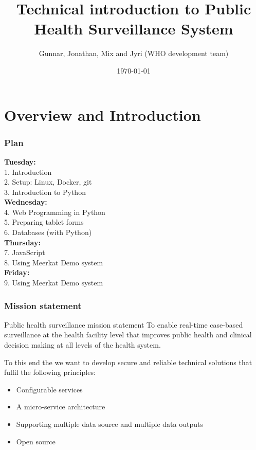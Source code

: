 \documentclass{beamer}
\title[Public Health Surveillance]{Technical introduction to Public Health Surveillance System}
\author{Gunnar, Jonathan, Mix and Jyri (WHO development team)}
\institute[WHO]{World Health Organisation}
\date{\today}
\begin{document}
\begin{frame}
\titlepage
\end{frame}

\begin{frame}
\tableofcontents
\end{frame}

\section{Overview and Introduction}
\begin{frame}
  \frametitle{Plan}

  \textbf{Tuesday:}\\
  	1. Introduction \\
	2. Setup: Linux, Docker, git \\
	3. Introduction to Python\\
  \textbf{ Wednesday:}\\
	4. Web Programming in Python \\
	5. Preparing tablet forms \\
	6. Databases (with Python) \\
  \textbf{Thursday:}\\
  	7. JavaScript\\
	8. Using Meerkat Demo system\\
  \textbf{ Friday:}\\
  	9. Using Meerkat Demo system\\
  
\end{frame}
\begin{frame}
  \frametitle{Mission statement}

  \begin{block}{Public health surveillance mission statement}
    To enable real-time case-based surveillance at the health facility level that improves public health and clinical decision making at all levels of the health system.
  \end{block}
  \vspace{10pt}
  To this end the we want to develop secure and reliable technical solutions that fulfil the following principles:

  
  \begin{itemize}
  \item Configurable services
  \item A micro-service architecture
  \item Supporting multiple data source and multiple data outputs
    \item Open source
  \end{itemize}
\end{frame}  
\end{document}
